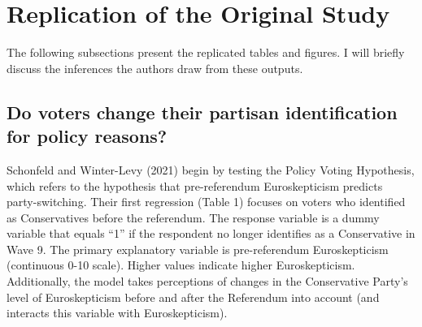 \documentclass[12pt,letterpaper]{article}
\begin{document}
	\section{Replication of the Original Study}
	The following subsections present the replicated tables and figures. I will briefly discuss the inferences the authors draw from these outputs. 
	
	\subsection{Do voters change their partisan identification for policy reasons?}
	Schonfeld and Winter-Levy (2021) begin by testing the Policy Voting Hypothesis, which refers to the hypothesis that pre-referendum Euroskepticism predicts party-switching. Their first regression (Table 1) focuses on voters who identified as Conservatives before the referendum. 
	The response variable is a dummy variable that equals “1” if the respondent no longer identifies as a Conservative in Wave 9. The primary explanatory variable is pre-referendum Euroskepticism (continuous 0-10 scale). Higher values indicate higher Euroskepticism. Additionally, the model takes perceptions of changes in the Conservative Party’s level of Euroskepticism before and after the Referendum into account (and interacts this variable with Euroskepticism). 
	
\end{document}
